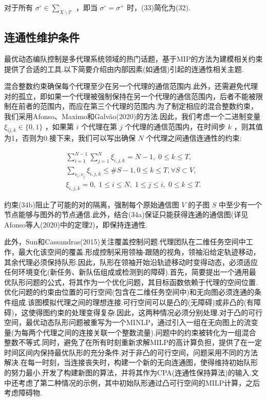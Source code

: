 \documentclass[10pt]{article}
\begin{document}
对于所有 \({\sigma }^{ \circ  } \in  {\sum }_{X \smallsetminus  \mathbb{P}}\) ，即当 \({\sigma }^{ \circ  } = {\sigma }^{ + }\) 时，(33)简化为(32).

\subsection{连通性维护条件}

最优动态编队控制是多代理系统领域的热门话题，基于MIP的方法为建模相关约束提供了合适的工具.以下简要介绍由内部因素(如通信)引起的连通性相关主题.

混合整数约束确保每个代理至少在另一个代理的通信范围内.此外，还需避免代理对的孤立，即如果一个代理被强制保持在另一个代理的通信范围内，后者不能被限制在前者的范围内，而应在第三个代理的范围内.为了制定相应的混合整数约束，我们采用Afonso、Maximo和Galvão(2020)的方法.因此，我们考虑一个二进制变量 \({\xi }_{{ij},k} \in  \{ 0,1\}\) ，如果第 \(i\) 个代理在第 \(j\) 个代理的通信范围内，在时间步 \(k\) ，则其值为1，否则为0.接下来，我们可以写出确保 \(N\) 个代理之间通信连通性的约束:

\begin{subequations}
\begin{gather}
\mathop{\sum }\limits_{{i = 1}}^{{N - 1}}\mathop{\sum }\limits_{{j = 1}}^{N}{\xi }_{i,j,k} = N - 1,\;0 \leq  k \leq  T, \\
\mathop{\sum }\limits_{{{v}_{i},{v}_{j}}}{\xi }_{i,j,k} \leq  \# S - 1,0 \leq  k \leq  T,\forall S \subset  V, \\
{\xi }_{i,j,k} = 0,\;1 \leq  i \leq  N,\;1 \leq  j \leq  i,\;0 \leq  k \leq  T.
\end{gather}
\end{subequations}

约束(34b)阻止了可能的对的隔离，强制每个原始通信图 \(V\) 的子图 \(S\) 中至少有一个节点能够与图外的节点通信.此外，结合(34a)保证只能获得连通的通信图(详见Afonso等人(2020)中的定理2)，即保持连通性.

此外，Sun和Cassandras(2015)关注覆盖控制问题.代理团队在二维任务空间中工作，最大化该空间的覆盖.形成控制采用领袖-跟随的视角，领袖沿给定轨迹移动，其余代理必须保持队形.因此，队形在领袖开始沿轨迹移动时变得动态，必须适应任何环境变化(新任务、新队伍组成或检测到的障碍).首先，简要提出一个通用最优队形问题的公式，将其作为一个优化问题，其目标函数依赖于代理的空间位置.优化问题的约束由位置的可行空间(包含在二维任务空间中)和无向图必须连通的条件组成.该图模拟代理之间的理想连接.可行空间可以是凸的(无障碍)或非凸的(有障碍)，这使得图约束的处理变得复杂.因此，这两种情况必须分别处理.对于凸的可行空间，最优动态队形问题被重写为一个MINLP，通过引入一组在无向图上的流变量(为每两个代理之间的连接关联一个整数流量).问题中的约束被转化为一组混合整数不等式.同时，避免了在所有时刻重新求解MILP的高计算负担，提供了在一定时间区间内保持最优队形的充分条件.对于非凸的可行空间，问题采用不同的方法解决.在每一时刻，当连接丧失时，构建一个新的无向连通图，使得维持初始队形的努力最小.开发了构建新图的算法，并将其作为CPA(连通性保持算法)的输入.文中还考虑了第二种情况的示例，其中初始队形通过凸可行空间的MILP计算，之后考虑障碍物.
\end{document}
